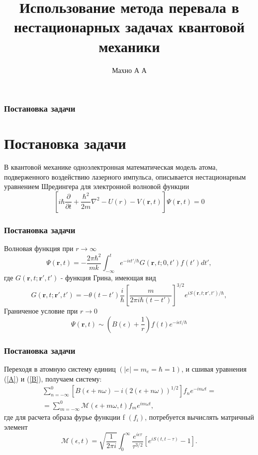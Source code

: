 \documentclass{beamer}
\newcommand{\vr}{\mathbf{r}}
\newcommand{\cM}{\mathcal{M}}
\begin{document}
\title{Использование метода перевала в нестационарных задачах квантовой механики}  
\author{Махно А А}
\date{}
\frame
{
	\titlepage 
	\small{}
} 




\frame
{
	\frametitle{Постановка задачи}
	\section{Постановка задачи}
	В квантовой механике одноэлектронная математическая модель атома, подверженного воздействию лазерного импульса, описывается нестационарным уравнением Шредингера для электронной волновой функции
	$$
	\left[i\hbar\frac{\partial}{\partial t} + \frac{\hbar^2}{2 m} \nabla^2 - U(r) - V(\vr, t)\right]\Psi(\vr, t) = 0
	$$
}

\frame
{
	\frametitle{Постановка задачи}
	Волновая функция при $r \rightarrow \infty$
	\begin{equation}\label{A}
		\Psi(\vr, t) = -\frac{2\pi\hbar^2}{m k} \int_{-\infty}^{t} e^{-i\epsilon t'/\hbar} G(\vr, t;0, t')f(t')dt',
	\end{equation}
	где $G(\vr, t;\vr', t')$ - функция Грина, имеющая вид
	\begin{equation}\nonumber
	\label{Green}
	G(\vr,t;\vr',t') = -\theta(t-t')\frac{i}{\hbar}\left[\frac{m}{2\pi i\hbar(t-t')}\right]^{3/2}e^{iS(\vr,t;\vr',t')/\hbar},
	\end{equation}
	Граниченое условие при $r \rightarrow 0$
	\begin{equation}\label{B}
	\Psi(\vr, t) \sim \left(B(\epsilon) + \frac{1}{r}\right)f(t)e^{-i\epsilon t/\hbar}
	\end{equation}
}

\frame
{
	\frametitle{Постановка задачи}
	Переходя в атомную систему единиц $(|e| = m_e = \hbar = 1)$, и сшивая уравнения (\ref{A}) и (\ref{B}), получаем систему:
	\begin{eqnarray}\label{system}
		\sum_{n = -\infty}^{0}[B(\epsilon + n\omega) - i(2(\epsilon + n\omega))^{1/2}]f_ne^{-i n\omega t} = \nonumber\\
		= \sum_{m = -\infty}^{0} \cM(\epsilon + m\omega,t)f_me^{i m \omega t}, 
	\end{eqnarray}
	где для расчета образа фурье функции f $(f_i)$,  
	потребуется вычислять матричный элемент
	\begin{equation}\label{input}
		\cM(\epsilon, t) = \sqrt{\frac{1}{2\pi i}}\int_{0}^{\infty}\frac{e^{i\epsilon\tau}}{\tau^{3/2}}\left[e^{iS(t, t-\tau)} - 1\right].
	\end{equation}
}
\end{document}

